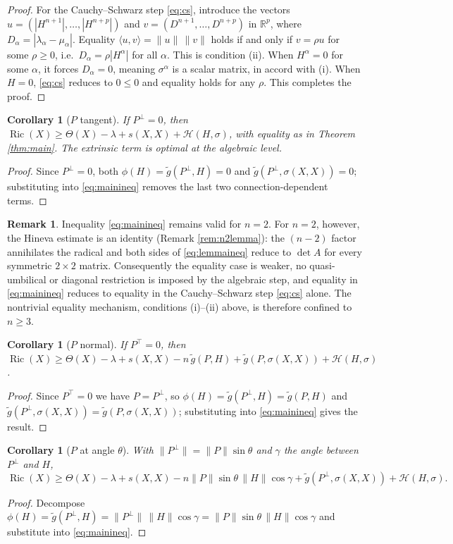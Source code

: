 \documentclass[11pt]{article}
\newtheorem{corollary}[theorem]{Corollary}
\theoremstyle{definition}
\newtheorem{remark}[theorem]{Remark}
\newcommand{\tg}{\widetilde{g}}
\newcommand{\Ric}{\operatorname{Ric}}
\newcommand{\HH}{\mathcal{H}}
\begin{document}
\begin{proof}
For the Cauchy--Schwarz step \eqref{eq:cs}, introduce the vectors $u=(|H^{n+1}|,\dots,|H^{n+p}|)$ and $v=(D^{n+1},\dots,D^{n+p})$ in $\mathbb{R}^p$, where $D_\alpha=|\lambda_\alpha-\mu_\alpha|$. Equality $\langle u,v\rangle=\|u\|\,\|v\|$ holds if and only if $v=\rho u$ for some $\rho\ge0$, i.e.\ $D_\alpha=\rho|H^\alpha|$ for all $\alpha$. This is condition (ii). When $H^\alpha=0$ for some $\alpha$, it forces $D_\alpha=0$, meaning $\sigma^\alpha$ is a scalar matrix, in accord with (i). When $H=0$, \eqref{eq:cs} reduces to $0\le0$ and equality holds for any $\rho$.
This completes the proof.
\end{proof}

\begin{corollary}[$P$ tangent]\label{cor:Ptan}
If $P^\perp=0$, then $\Ric(X)\ge\Theta(X)-\lambda+s(X,X)+\HH(H,\sigma)$, with equality as in Theorem \ref{thm:main}. The extrinsic term is optimal at the algebraic level.
\end{corollary}
\begin{proof}
Since $P^\perp=0$, both $\phi(H)=\tg(P^\perp,H)=0$ and $\tg(P^\perp,\sigma(X,X))=0$; substituting into \eqref{eq:mainineq} removes the last two connection-dependent terms.
\end{proof}
\begin{remark}\label{rem:n2main}
Inequality \eqref{eq:mainineq} remains valid for $n=2$. For $n=2$, however, the Hineva estimate is an identity (Remark \ref{rem:n2lemma}): the $(n-2)$ factor annihilates the radical and both sides of \eqref{eq:lemmaineq} reduce to $\det A$ for every symmetric $2\times2$ matrix. Consequently the equality case is weaker, no quasi-umbilical or diagonal restriction is imposed by the algebraic step, and equality in \eqref{eq:mainineq} reduces to equality in the Cauchy--Schwarz step \eqref{eq:cs} alone. The nontrivial equality mechanism, conditions (i)--(ii) above, is therefore confined to $n\ge3$.
\end{remark}
\begin{corollary}[$P$ normal]\label{cor:Pnor}
If $P^\top=0$, then $\Ric(X)\ge\Theta(X)-\lambda+s(X,X)-n\,\tg(P,H)+\tg(P,\sigma(X,X))+\HH(H,\sigma)$.
\end{corollary}
\begin{proof}
Since $P^\top=0$ we have $P=P^\perp$, so $\phi(H)=\tg(P^\perp,H)=\tg(P,H)$ and $\tg(P^\perp,\sigma(X,X))=\tg(P,\sigma(X,X))$; substituting into \eqref{eq:mainineq} gives the result.
\end{proof}

\begin{corollary}[$P$ at angle $\theta$]\label{cor:Pangle}
With $\|P^\perp\|=\|P\|\sin\theta$ and $\gamma$ the angle between $P^\perp$ and $H$,
\begin{equation}\label{eq:Pangle}
\Ric(X)\ge\Theta(X)-\lambda+s(X,X)-n\|P\|\sin\theta\,\|H\|\cos\gamma+\tg(P^\perp,\sigma(X,X))+\HH(H,\sigma).
\end{equation}
\end{corollary}
\begin{proof}
Decompose $\phi(H)=\tg(P^\perp,H)=\|P^\perp\|\,\|H\|\cos\gamma=\|P\|\sin\theta\,\|H\|\cos\gamma$ and substitute into \eqref{eq:mainineq}.
\end{proof}
\end{document}

